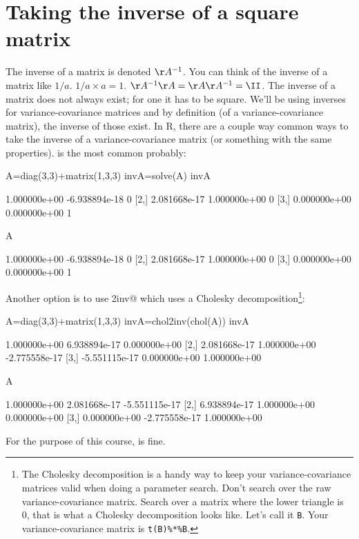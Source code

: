 \section{Taking the inverse of a square matrix}
The inverse of a matrix is denoted $\AA^{-1}$.  You can think of the inverse of a matrix like $1/a$.  $1/a \times a = 1$. $\AA^{-1}\AA = \AA\AA^{-1} = \II$.  The inverse of a matrix does not always exist; for one it has to be square.  We'll be using inverses for variance-covariance matrices and by definition (of a variance-covariance matrix), the inverse of those exist.  In R, there are a couple way common ways to take the inverse of a variance-covariance matrix (or something with the same properties).  \verb@solve@ is the most common probably:
\begin{Schunk}
\begin{Sinput}
 A=diag(3,3)+matrix(1,3,3)
 invA=solve(A)
 invA%*%A
\end{Sinput}
\begin{Soutput}
             [,1]          [,2] [,3]
[1,] 1.000000e+00 -6.938894e-18    0
[2,] 2.081668e-17  1.000000e+00    0
[3,] 0.000000e+00  0.000000e+00    1
\end{Soutput}
\begin{Sinput}
 A%*%invA
\end{Sinput}
\begin{Soutput}
             [,1]          [,2] [,3]
[1,] 1.000000e+00 -6.938894e-18    0
[2,] 2.081668e-17  1.000000e+00    0
[3,] 0.000000e+00  0.000000e+00    1
\end{Soutput}
\end{Schunk}
Another option is to use \verb@chol2inv@ which uses a Cholesky decomposition\footnote{The Cholesky decomposition is a handy way to keep your variance-covariance matrices valid when doing a parameter search.  Don't search over the raw variance-covariance matrix.  Search over a matrix where the lower triangle is 0, that is what a Cholesky decomposition looks like.  Let's call it \texttt{B}. Your variance-covariance matrix is \texttt{t(B)\%*\%B}.}:
\begin{Schunk}
\begin{Sinput}
 A=diag(3,3)+matrix(1,3,3)
 invA=chol2inv(chol(A))
 invA%*%A
\end{Sinput}
\begin{Soutput}
              [,1]         [,2]          [,3]
[1,]  1.000000e+00 6.938894e-17  0.000000e+00
[2,]  2.081668e-17 1.000000e+00 -2.775558e-17
[3,] -5.551115e-17 0.000000e+00  1.000000e+00
\end{Soutput}
\begin{Sinput}
 A%*%invA
\end{Sinput}
\begin{Soutput}
             [,1]          [,2]          [,3]
[1,] 1.000000e+00  2.081668e-17 -5.551115e-17
[2,] 6.938894e-17  1.000000e+00  0.000000e+00
[3,] 0.000000e+00 -2.775558e-17  1.000000e+00
\end{Soutput}
\end{Schunk}
For the purpose of this course, \verb@solve@ is fine.

